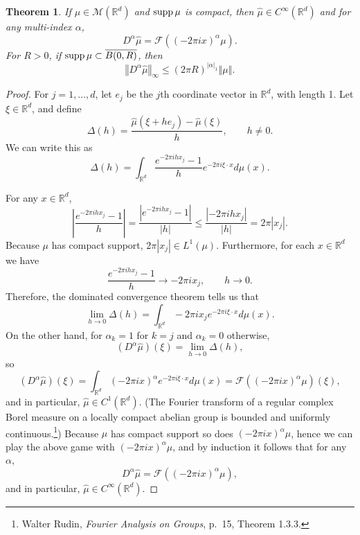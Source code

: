 \documentclass{article}
\newcommand{\supp}{\ensuremath\mathrm{supp}\,}
\newcommand{\norm}[1]{\left\Vert #1 \right\Vert}
\newtheorem{theorem}{Theorem}
\theoremstyle{definition}
\begin{document}
\begin{theorem}
If $\mu \in \mathcal{M}(\mathbb{R}^d)$ and $\supp \mu$ is compact, then $\hat{\mu} \in C^\infty(\mathbb{R}^d)$
and for any multi-index $\alpha$,
\[
D^\alpha \hat{\mu} = \mathscr{F}((-2\pi ix)^\alpha \mu).
\]
For $R>0$, if $\supp \mu \subset \overline{B(0,R)}$, then 
\[
\norm{D^\alpha \hat{\mu}}_\infty \leq (2\pi R)^{|\alpha|_1} \norm{\mu}.
\]
\label{mucompact}
\end{theorem}
\begin{proof}
For $j=1,\ldots,d$, let $e_j$ be the $j$th coordinate vector in $\mathbb{R}^d$, with length 1. 
Let $\xi \in \mathbb{R}^d$, and define
\[
\Delta(h) = \frac{\hat{\mu}(\xi+he_j)-\hat{\mu}(\xi)}{h}, \qquad h \neq 0.
\]
We can write this as
\[
\Delta(h) = \int_{\mathbb{R}^d} \frac{e^{-2\pi ihx_j}-1}{h} e^{-2\pi i\xi\cdot x} d\mu(x).
\]

For any $x \in \mathbb{R}^d$,
\[
\left|  \frac{e^{-2\pi ihx_j}-1}{h} \right| = \frac{|e^{-2\pi ihx_j}-1|}{|h|} 
\leq \frac{|-2\pi i hx_j|}{|h|} = 2\pi |x_j|.
\]
Because $\mu$ has compact support, $2\pi |x_j| \in L^1(\mu)$. Furthermore,
for each $x \in \mathbb{R}^d$ we have
\[
 \frac{e^{-2\pi ihx_j}-1}{h} \to -2\pi i x_j, \qquad h \to 0.
\]
Therefore, the dominated convergence theorem tells us that
\[
\lim_{h \to 0} \Delta(h) = \int_{\mathbb{R}^d} -2\pi i x_j e^{-2\pi i\xi \cdot x} d\mu(x).
\]
On the other hand, for $\alpha_k=1$ for $k=j$ and $\alpha_k=0$ otherwise,
\[
(D^\alpha \hat{\mu}) (\xi) = \lim_{h \to 0} \Delta(h),
\]
so
\[
(D^\alpha \hat{\mu}) (\xi) =  \int_{\mathbb{R}^d} (-2\pi i x)^\alpha e^{-2\pi i\xi\cdot x} d\mu(x)
= \mathscr{F}((-2\pi ix)^\alpha \mu)(\xi),
\]
and in particular, $\hat{\mu} \in C^1(\mathbb{R}^d)$. (The Fourier transform of a regular complex Borel measure on a locally compact abelian group
is bounded and uniformly continuous.\footnote{Walter Rudin, {\em Fourier Analysis on Groups}, p.~15, Theorem 1.3.3.})
Because $\mu$ has compact support so does $(-2\pi ix)^\alpha \mu$, hence we can play the above game
with $(-2\pi ix)^\alpha \mu$, and by induction it follows that for any $\alpha$,
\[
D^\alpha \hat{\mu} = \mathscr{F}((-2\pi ix)^\alpha \mu),
\]
and in particular, $\hat{\mu} \in C^\infty(\mathbb{R}^d)$. 


\end{proof}
\end{document}
